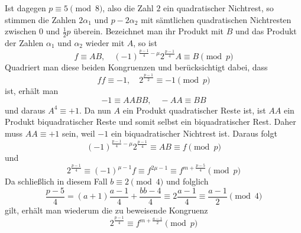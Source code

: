 Ist dagegen $p\equiv5\pmod8$, also die Zahl $2$ ein quadratischer Nichtrest, so stimmen die Zahlen $2\alpha_1$ und $p-2\alpha_2$ mit sämtlichen quadratischen Nichtresten zwischen $0$ und $\frac12p$ überein. Bezeichnet man ihr Produkt mit $B$ und das Produkt der Zahlen $\alpha_1$ und $\alpha_2$ wieder mit $A$, so ist
\[
f\equiv AB,\quad(-1)^{\frac{p-1}4-\mu}2^{\frac{p-1}4}A\equiv B\pmod p
\]
Quadriert man diese beiden Kongruenzen und berücksichtigt dabei, dass
\[
ff\equiv-1,\quad2^{\frac{p-1}2}\equiv-1\pmod p
\]
ist, erhält man
\[
-1\equiv AABB,\quad-AA\equiv BB
\]
und daraus $A^4\equiv+1$. Da nun $A$ ein Produkt quadratischer Reste ist, ist $AA$ ein Produkt biquadratischer Reste und somit selbst ein biquadratischer Rest. Daher muss $AA\equiv+1$ sein, weil $-1$ ein biquadratischer Nichtrest ist. Daraus folgt
\[
(-1)^{\frac{p-1}4-\mu}2^{\frac{p-1}4}\equiv AB\equiv f\pmod p
\]
und
\[
2^{\frac{p-1}4}\equiv(-1)^{\mu-1}f\equiv f^{2\mu-1}\equiv f^{m+\frac{p-5}4}\pmod p
\]
Da schließlich in diesem Fall $b\equiv2\pmod4$ und folglich
\[
\frac{p-5}4=(a+1)\frac{a-1}4+\frac{bb-4}4\equiv2\frac{a-1}4\equiv\frac{a-1}2\pmod4
\]
gilt, erhält man wiederum die zu beweisende Kongruenz
\[
2^{\frac{p-1}4}\equiv f^{m+\frac{a-1}2}\pmod p
\]
\BookRule{35mm}
\par\endgroup
